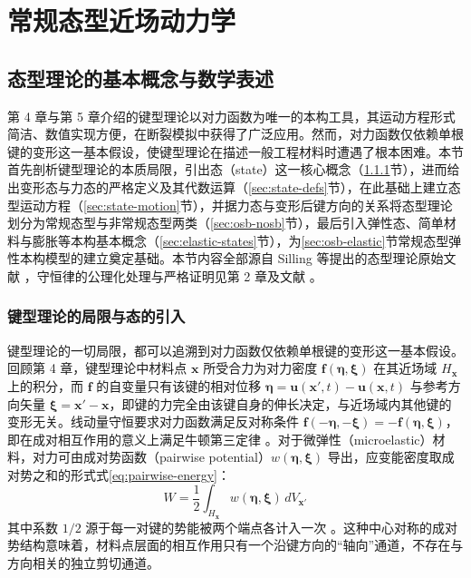\chapter{常规态型近场动力学}

\leavevmode\usetikzlibrary{arrows.meta}

\section{态型理论的基本概念与数学表述}

第 4 章与第 5 章介绍的键型理论以对力函数为唯一的本构工具，其运动方程形式简洁、数值实现方便，在断裂模拟中获得了广泛应用。然而，对力函数仅依赖单根键的变形这一基本假设，使键型理论在描述一般工程材料时遭遇了根本困难。本节首先剖析键型理论的本质局限，引出态（state）这一核心概念（\ref{sec:state-limits}节），进而给出变形态与力态的严格定义及其代数运算（\ref{sec:state-defs}节），在此基础上建立态型运动方程（\ref{sec:state-motion}节），并据力态与变形后键方向的关系将态型理论划分为常规态型与非常规态型两类（\ref{sec:osb-nosb}节），最后引入弹性态、简单材料与膨胀等本构基本概念（\ref{sec:elastic-states}节），为\ref{sec:osb-elastic}节常规态型弹性本构模型的建立奠定基础。本节内容全部源自 Silling 等提出的态型理论原始文献 \cite{Silling2007}，守恒律的公理化处理与严格证明见第 2 章及文献 \cite{SillingLehoucq2010}。

\subsection{键型理论的局限与态的引入}\label{sec:state-limits}

键型理论的一切局限，都可以追溯到对力函数仅依赖单根键的变形这一基本假设。回顾第 4 章，键型理论中材料点 $\mathbf{x}$ 所受合力为对力密度 $\mathbf{f}(\boldsymbol{\eta},\boldsymbol{\xi})$ 在其近场域 $H_{\mathbf{x}}$ 上的积分，而 $\mathbf{f}$ 的自变量只有该键的相对位移 $\boldsymbol{\eta}=\mathbf{u}(\mathbf{x}',t)-\mathbf{u}(\mathbf{x},t)$ 与参考方向矢量 $\boldsymbol{\xi}=\mathbf{x}'-\mathbf{x}$，即键的力完全由该键自身的伸长决定，与近场域内其他键的变形无关。线动量守恒要求对力函数满足反对称条件 $\mathbf{f}(-\boldsymbol{\eta},-\boldsymbol{\xi})=-\mathbf{f}(\boldsymbol{\eta},\boldsymbol{\xi})$，即在成对相互作用的意义上满足牛顿第三定律 \cite{Silling2000}。对于微弹性（microelastic）材料，对力可由成对势函数（pairwise potential）$w(\boldsymbol{\eta},\boldsymbol{\xi})$ 导出，应变能密度取成对势之和的形式式\eqref{eq:pairwise-energy}：
\begin{equation}
  W=\frac{1}{2}\int_{H_{\mathbf{x}}}w(\boldsymbol{\eta},\boldsymbol{\xi})\,dV_{\mathbf{x}'}
  \label{eq:pairwise-energy}
\end{equation}
其中系数 $1/2$ 源于每一对键的势能被两个端点各计入一次 \cite{Silling2000,Silling2007}。这种中心对称的成对势结构意味着，材料点层面的相互作用只有一个沿键方向的“轴向”通道，不存在与方向相关的独立剪切通道。

